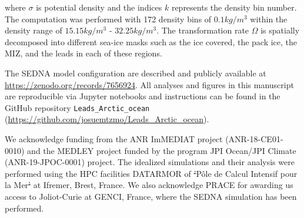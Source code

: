 \documentclass[lineno,sn-basic]{sn-jnl}%
\providecommand{\DIFadd}[1]{{\protect\color{blue}\uwave{#1}}} %
\providecommand{\DIFdel}[1]{{\protect\color{red}\sout{#1}}}                      %
\providecommand{\DIFaddbegin}{} %
\providecommand{\DIFaddend}{} %
\providecommand{\DIFdelbegin}{} %
\providecommand{\DIFdelend}{} %
\newcommand{\DIFscaledelfig}{0.5}
\newlength{\DIFdelgraphicswidth} %
\newlength{\DIFdelgraphicsheight} %
\newcommand{\DIFaddincludegraphics}[2][]{{\color{blue}\fbox{\DIFOincludegraphics[#1]{#2}}}} %
\newcommand{\DIFdelincludegraphics}[2][]{%
\sbox{\DIFdelgraphicsbox}{\DIFOincludegraphics[#1]{#2}}%
\settoboxwidth{\DIFdelgraphicswidth}{\DIFdelgraphicsbox} %
\settoboxtotalheight{\DIFdelgraphicsheight}{\DIFdelgraphicsbox} %
\scalebox{\DIFscaledelfig}{%
\parbox[b]{\DIFdelgraphicswidth}{\usebox{\DIFdelgraphicsbox}\\[-\baselineskip] \rule{\DIFdelgraphicswidth}{0em}}\llap{\resizebox{\DIFdelgraphicswidth}{\DIFdelgraphicsheight}{%
\setlength{\unitlength}{\DIFdelgraphicswidth}%
\begin{picture}(1,1)%
\thicklines\linethickness{2pt} %
{\color[rgb]{1,0,0}\put(0,0){\framebox(1,1){}}}%
{\color[rgb]{1,0,0}\put(0,0){\line( 1,1){1}}}%
{\color[rgb]{1,0,0}\put(0,1){\line(1,-1){1}}}%
\end{picture}%
}\hspace*{3pt}}} %
} %
\DeclareRobustCommand{\DIFaddbegin}{\DIFOaddbegin \let\includegraphics\DIFaddincludegraphics} %
\DeclareRobustCommand{\DIFaddend}{\DIFOaddend \let\includegraphics\DIFOincludegraphics} %
\DeclareRobustCommand{\DIFdelbegin}{\DIFOdelbegin \let\includegraphics\DIFdelincludegraphics} %
\DeclareRobustCommand{\DIFdelend}{\DIFOaddend \let\includegraphics\DIFOincludegraphics} %
\begin{document}
\DIFdelend where $\sigma$ is potential density and the indices $k$ represents the density bin number. The computation was performed with 172 density bins of $0.1 kg/m^3$ within the density range of $15.15 kg/m^3$ - $32.25 kg/m^3$. The transformation rate $\Omega$ is spatially decomposed into different sea-ice masks such as the ice covered, the pack ice, the MIZ, and the leads in each of these regions. 

\backmatter


The SEDNA model configuration are described and publicly available at \url{https://zenodo.org/records/7656924}.
All analyses and figures in this manuscript are reproducible via Jupyter notebooks and instructions can be found in the GitHub repository \texttt{Leads\_Arctic\_ocean} (\url{https://github.com/josuemtzmo/Leads_Arctic_ocean}).


We acknowledge funding from the ANR ImMEDIAT project (ANR-18-CE01-0010) and the MEDLEY project funded by the program JPI Ocean/JPI Climate (ANR-19-JPOC-0001) project. 
The idealized simulations and their analysis were performed using the HPC facilities DATARMOR of \DIFdelbegin \DIFdel{’}\DIFdelend \DIFaddbegin \DIFadd{`}\DIFaddend Pôle de Calcul Intensif pour la Mer\DIFdelbegin \DIFdel{’ }\DIFdelend \DIFaddbegin \DIFadd{' }\DIFaddend at Ifremer, Brest, France. We also acknowledge PRACE for awarding us access to Joliot-Curie at GENCI\makeatletter@CEA, France, where the SEDNA simulation has been performed.

\end{document}
